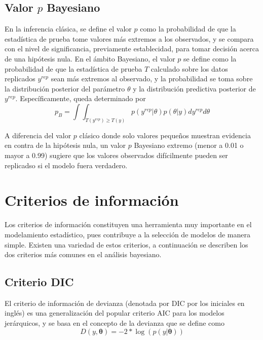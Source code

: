\documentclass[
  spanish,
  letter]{book}
\theoremstyle{definition}
\theoremstyle{definition}
\theoremstyle{definition}
\theoremstyle{remark}
\begin{document}
\hypertarget{valor-p-bayesiano}{%
\subsection{\texorpdfstring{Valor \(p\) Bayesiano}{Valor p Bayesiano}}\label{valor-p-bayesiano}}

En la inferencia clásica, se define el valor \(p\) como la probabilidad de que la estadística de prueba tome valores más extremos a los observados, y se compara con el nivel de significancia, previamente establecidad, para tomar decisión acerca de una hipótesis nula. En el ámbito Bayesiano, el valor \(p\) se define como la probabilidad de que la estadística de prueba \(T\) calculado sobre los datos replicados \(y^{rep}\) sean más extremos al observado, y la probabilidad se toma sobre la distribución posterior del parámetro \(\theta\) y la distribución predictiva posterior de \(y^{rep}\). Específicamente, queda determinado por
\begin{equation*}
p_B=\int\int_{{T(y^{rep})\geq T(y)}}p(y^{rep}|\theta)p(\theta|y)dy^{rep}d\theta
\end{equation*}

A diferencia del valor \(p\) clásico donde solo valores pequeños muestran evidencia en contra de la hipótesis nula, un valor \(p\) Bayesiano extremo (menor a 0.01 o mayor a 0.99) sugiere que los valores observados difícilmente pueden ser replicadso si el modelo fuera verdadero.

\section{Criterios de información}

Los criterios de información constituyen una herramienta muy importante en el modelamiento estadístico, pues contribuye a la selección de modelos de manera simple. Existen una variedad de estos criterios, a continuación se describen los dos criterios más comunes en el análisis bayesiano.

\hypertarget{criterio-dic}{%
\subsection{Criterio DIC}\label{criterio-dic}}

El criterio de información de devianza (denotada por DIC por los iniciales en inglés) es una generalización del popular criterio AIC para los modelos jerárquicos, y se basa en el concepto de la devianza que se define como
\begin{equation}
D(y, \boldsymbol \theta)=-2*\log(p(y|\boldsymbol \theta))
\end{equation}
\end{document}
